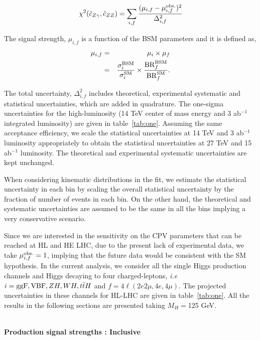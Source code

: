 \begin{equation}
 \chi^2(\tilde c_{Z\gamma},\tilde c_{ZZ}) = \sum_{i,f} \frac{(\mu_{i,f} -\mu_{i,f}^{\rm obs.})^2}{\Delta_{i,f}^2}
\end{equation}
{
The signal strength, $\mu_{i,f}$ is a function of the BSM parameters and it is defined as, 
\begin{eqnarray}
 \mu_{i,f} &=& \mu_i \times \mu_f \\
         &=& \frac{\sigma_i^{\rm BSM}}{\sigma_i^{\rm SM}} \times \frac{{\rm BR}_f^{ \rm BSM}}{{\rm BR}_f^{ \rm SM}}.
\end{eqnarray}

The total uncertainty, $\Delta_{i,f}^2$ includes theoretical, experimental systematic and statistical uncertainties, which 
are added in quadrature.
The one-sigma uncertainties for the high-luminosity (14 TeV center of mass energy and 3 ab$^{-1}$ integrated luminosity) are given in table~\ref{tab:one}. 
Assuming the same acceptance efficiency, we scale the statistical uncertainties at 14 TeV and 3 ab$^{-1}$ luminosity appropriately 
to obtain the statistical uncertainties at 27 TeV and 15 ab$^{-1}$ 
luminosity. The theoretical and experimental systematic uncertainties are kept unchanged.

When considering kinematic distributions in the fit, we estimate the statistical uncertainty in each bin by scaling 
the overall statistical uncertainty by the fraction of number 
of events in each bin. On the other hand, the theoretical 
and systematic uncertainties are assumed to be the same in all the bins implying 
a very conservative scenario.


Since we are interested in the sensitivity on the CPV parameters that can be reached at HL and HE LHC, due to the present lack of experimental data, we take 
$\mu_{i,f}^{\rm obs.}=1$, implying that the future data would be consistent with the SM hypothesis. In the current analysis, we consider all the single Higgs production channels and Higgs decaying to four charged-leptons, {\it i.e} $i={{\rm ggF, VBF}, ZH, WH, t{\bar t}H}$ and $f=4\ell (2e2\mu, 4e, 4\mu)$. The projected uncertainties in these channels for HL-LHC are given in table~\ref{tab:one}. 
All the results in the following sections are presented taking $M_H=$125 GeV.
}\\

{\bf Production signal strengths : Inclusive} \\

